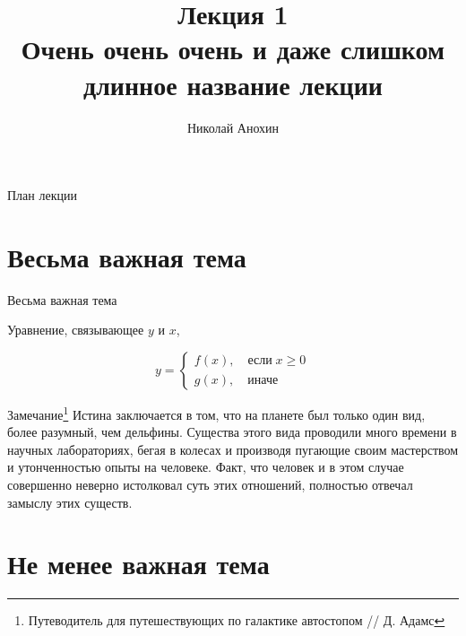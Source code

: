 \documentclass[10pt]{beamer}
\author{Николай Анохин}
\title{\newline \newline \newline Лекция 1 \\ Очень очень очень и даже слишком \\ длинное название лекции}
\begin{document}
\begin{frame}{}
\titlepage
\end{frame}

\begin{frame}{План лекции}
\tableofcontents
\end{frame}

\section{Весьма важная тема}

\begin{frame}{Весьма важная тема}

Уравнение, связывающее $y$ и $x$,

\[
y = \begin{cases}
f(x),\quad\text{если}\;x \geqslant 0 \\
g(x),\quad\text{иначе}
\end{cases}
\]

\begin{alertblock}{Замечание\footnote{Путеводитель для путешествующих по галактике автостопом // Д. Адамс}}
Истина заключается в том, что на планете был только один вид, более разумный, чем дельфины. Существа этого вида проводили много времени в научных лабораториях, бегая в колесах и производя пугающие своим мастерством и утонченностью опыты на человеке. Факт, что человек и в этом случае совершенно неверно истолковал суть этих отношений, полностью отвечал замыслу этих существ.
\end{alertblock}

\end{frame}

\section{Не менее важная тема}
\end{document}
